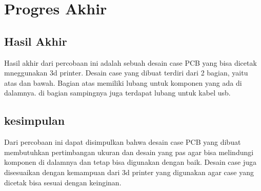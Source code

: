 \section*{Progres Akhir}
\indent
\subsection*{Hasil Akhir}
Hasil akhir dari percobaan ini adalah sebuah desain case PCB yang bisa dicetak mneggunakan 3d printer. Desain case yang dibuat terdiri dari 2 bagian, yaitu atas dan bawah. Bagian atas memiliki lubang untuk komponen yang ada di dalamnya. di bagian sampingnya juga terdapat lubang untuk kabel usb. \\

\subsection*{kesimpulan}
Dari percobaan ini dapat disimpulkan bahwa desain case PCB yang dibuat membutuhkan pertimbangan ukuran dan desain yang pas agar bisa melindungi komponen di dalamnya dan tetap bisa digunakan dengan baik. Desain case juga disesuaikan dengan kemampuan dari 3d printer yang digunakan agar case yang dicetak bisa sesuai dengan keinginan.